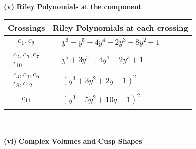 \documentclass[1p]{elsarticle_modified}
\theoremstyle{definition}
\begin{document}
\newpage\renewcommand{\arraystretch}{1}
\flushleft \textbf{(v) Riley Polynomials at the component}\newline \\
\begin{tabular}{m{50pt}|m{274pt}}
Crossings & \hspace{64pt}Riley Polynomials at each crossing \\
\hline $$\begin{aligned}c_{1},c_{9}\end{aligned}$$&$\begin{aligned}
&y^6- y^5+4 y^4-2 y^3+8 y^2+1
\end{aligned}$\\
\hline $$\begin{aligned}c_{2},c_{5},c_{7}\\c_{10}\end{aligned}$$&$\begin{aligned}
&y^6+3 y^5+4 y^4+2 y^3+1
\end{aligned}$\\
\hline $$\begin{aligned}c_{3},c_{4},c_{6}\\c_{8},c_{12}\end{aligned}$$&$\begin{aligned}
&(y^3+3 y^2+2 y-1)^2
\end{aligned}$\\
\hline $$\begin{aligned}c_{11}\end{aligned}$$&$\begin{aligned}
&(y^3-5 y^2+10 y-1)^2
\end{aligned}$\\
\hline
\end{tabular}\\~\\
\newpage\flushleft \textbf{(vi) Complex Volumes and Cusp Shapes}
\end{document}
